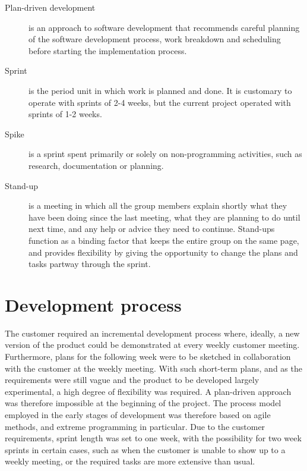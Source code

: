\begin{description}
\item[Plan-driven development] \label{def:plan-driven} is an approach to software development that recommends careful planning of the software development process, work breakdown and scheduling before starting the implementation process. 

\item[Sprint] \label{def:sprint} is the period unit in which work is planned and done. It is customary to operate with sprints of 2-4 weeks, but the current project operated with sprints of 1-2 weeks.

\item[Spike] \label{def:spike} is a sprint spent primarily or solely on non-programming activities, such as research, documentation or planning.

\item[Stand-up] \label{def:dailyScrum} is a meeting in which all the group members explain shortly what they have been doing since the last meeting, what they are planning to do until next time, and any help or advice they need to continue. Stand-ups function as a binding factor that keeps the entire group on the same page, and provides flexibility by giving the opportunity to change the plans and tasks partway through the sprint.

\end{description}

\section{Development process}
\label{def:devProcess}
The customer required an incremental development process where, ideally, a new version of the product could be demonstrated at every weekly customer meeting. Furthermore, plans for the following week were to be sketched in collaboration with the customer at the weekly meeting. With such short-term plans, and as the requirements were still vague and the product to be developed largely experimental, a high degree of flexibility was required. A plan-driven approach was therefore impossible at the beginning of the project. The process model employed in the early stages of development was therefore based on agile methods, and extreme programming in particular. Due to the customer requirements, sprint length was set to one week, with the possibility for two week sprints in certain cases, such as when the customer is unable to show up to a weekly meeting, or the required tasks are more extensive than usual. 


